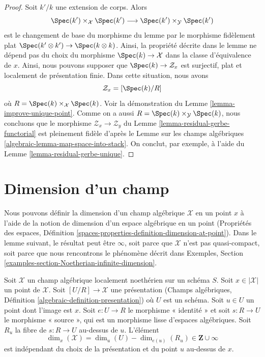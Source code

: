 \begin{proof}
Soit $k'/k$ une extension de corps. Alors
$$
\Spec(k') \times_\mathcal{X} \Spec(k')
\longrightarrow
\Spec(k') \times_\mathcal{Y} \Spec(k')
$$
est le changement de base du morphisme du lemme par le
morphisme fidèlement plat $\Spec(k' \otimes k') \to \Spec(k \otimes k)$.
Ainsi, la propriété décrite dans le lemme ne dépend pas du
choix du morphisme $\Spec(k) \to \mathcal{X}$ dans la
classe d'équivalence de $x$. Ainsi, nous pouvons supposer que
$\Spec(k) \to \mathcal{Z}_x$ est surjectif, plat et
localement de présentation finie. Dans cette situation, nous avons
$$
\mathcal{Z}_x = [\Spec(k)/R]
$$
où $R = \Spec(k) \times_\mathcal{X} \Spec(k)$. Voir la
démonstration du Lemme \ref{lemma-improve-unique-point}.
Comme on a aussi $R = \Spec(k) \times_\mathcal{Y} \Spec(k)$,
nous concluons que le morphisme $\mathcal{Z}_x \to \mathcal{Z}_y$
du Lemme \ref{lemma-residual-gerbe-functorial}
est pleinement fidèle d'après le
Lemme sur les champs algébriques \ref{algebraic-lemma-map-space-into-stack}.
On conclut, par exemple, à l'aide du Lemme \ref{lemma-residual-gerbe-unique}.
\end{proof}








\section{Dimension d'un champ}
\label{section-dimension}

\noindent
Nous pouvons définir la dimension d'un champ algébrique $\mathcal{X}$
en un point $x$ à l'aide de la notion de dimension d'un espace algébrique
en un point (Propriétés des espaces, Définition
\ref{spaces-properties-definition-dimension-at-point}).
Dans le lemme suivant, le résultat peut être $\infty$, soit parce que
$\mathcal{X}$ n'est pas quasi-compact, soit parce que nous rencontrons le
phénomène décrit dans Exemples, Section
\ref{examples-section-Noetherian-infinite-dimension}.

\begin{lemma}
\label{lemma-dimension-at-point-well-defined}
Soit $\mathcal{X}$ un champ algébrique localement noethérien sur un schéma $S$.
Soit $x \in |\mathcal{X}|$ un point de $\mathcal{X}$.
Soit $[U/R] \to \mathcal{X}$ une présentation
(Champs algébriques, Définition \ref{algebraic-definition-presentation})
où $U$ est un schéma. Soit $u \in U$ un point dont l'image est $x$.
Soit $e : U \to R$ le morphisme « identité » et soit $s : R \to U$ le
morphisme « source », qui est un morphisme lisse d'espaces algébriques. Soit $R_u$
la fibre de $s : R \to U$ au-dessus de $u$. L'élément
$$
\dim_x(\mathcal{X}) = \dim_u(U) - \dim_{e(u)}(R_u) \in \mathbf{Z} \cup \infty
$$
est indépendant du choix de la présentation et du point $u$ au-dessus de $x$.
\end{lemma}

